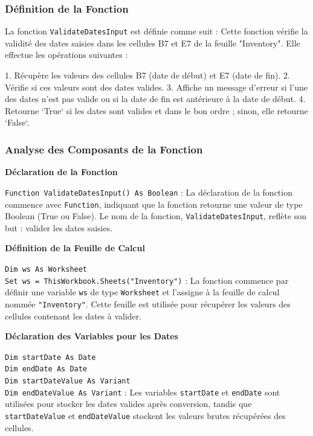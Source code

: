 \documentclass[a4paper, oneside, 12pt, final]{extreport}
\begin{document}
\subsubsection{Définition de la Fonction}

La fonction \texttt{ValidateDatesInput} est définie comme suit :
Cette fonction vérifie la validité des dates saisies dans les cellules B7 et E7 de la feuille "Inventory". Elle effectue les opérations suivantes :

1. Récupère les valeurs des cellules B7 (date de début) et E7 (date de fin).
2. Vérifie si ces valeurs sont des dates valides.
3. Affiche un message d'erreur si l'une des dates n'est pas valide ou si la date de fin est antérieure à la date de début.
4. Retourne `True` si les dates sont valides et dans le bon ordre ; sinon, elle retourne `False`.

\subsubsection{Analyse des Composants de la Fonction}

\textbf{Déclaration de la Fonction}

\texttt{Function ValidateDatesInput() As Boolean} : La déclaration de la fonction commence avec \texttt{Function}, indiquant que la fonction retourne une valeur de type Boolean (True ou False). Le nom de la fonction, \texttt{ValidateDatesInput}, reflète son but : valider les dates saisies.

\textbf{Définition de la Feuille de Calcul}

\texttt{Dim ws As Worksheet} \\
\texttt{Set ws = ThisWorkbook.Sheets("Inventory")} : La fonction commence par définir une variable \texttt{ws} de type \texttt{Worksheet} et l'assigne à la feuille de calcul nommée \texttt{"Inventory"}. Cette feuille est utilisée pour récupérer les valeurs des cellules contenant les dates à valider.

\textbf{Déclaration des Variables pour les Dates}

\texttt{Dim startDate As Date} \\
\texttt{Dim endDate As Date} \\
\texttt{Dim startDateValue As Variant} \\
\texttt{Dim endDateValue As Variant} : Les variables \texttt{startDate} et \texttt{endDate} sont utilisées pour stocker les dates valides après conversion, tandis que \texttt{startDateValue} et \texttt{endDateValue} stockent les valeurs brutes récupérées des cellules.
\end{document}

